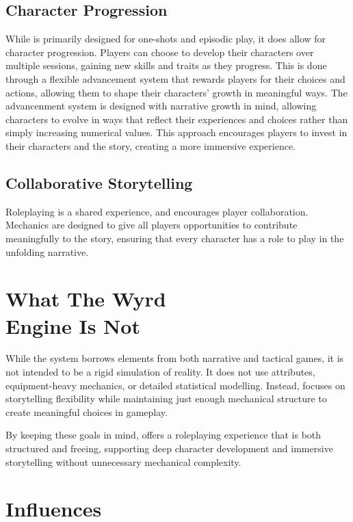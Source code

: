 \subsection{Character Progression}

While \wyrd is primarily designed for one-shots and episodic play, it does allow for character progression. Players can choose to develop their characters over multiple sessions, gaining new skills and traits as they progress. This is done through a flexible advancement system that rewards players for their choices and actions, allowing them to shape their characters' growth in meaningful ways. The advancenment system is designed with narrative growth in mind, allowing characters to evolve in ways that reflect their experiences and choices rather than simply increasing numerical values. This approach encourages players to invest in their characters and the story, creating a more immersive experience.


\subsection{Collaborative Storytelling}
Roleplaying is a shared experience, and \wyrd encourages player collaboration. Mechanics are designed to give all players opportunities to contribute meaningfully to the story, ensuring that every character has a role to play in the unfolding narrative.

\section[What The Wyrd Engine Is Not]{What The Wyrd\\Engine Is Not}

While the system borrows elements from both narrative and tactical games, it is not intended to be a rigid simulation of reality. It does not use attributes, equipment-heavy mechanics, or detailed statistical modelling. Instead, \wyrd focuses on storytelling flexibility while maintaining just enough mechanical structure to create meaningful choices in gameplay.

By keeping these goals in mind, \wyrd offers a roleplaying experience that is both structured and freeing, supporting deep character development and immersive storytelling without unnecessary mechanical complexity.

\section{Influences}

